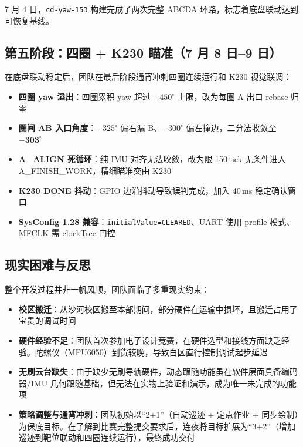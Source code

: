 \documentclass[12pt,a4paper]{ctexart}
\begin{document}
7 月 4 日，\texttt{cd-yaw-153} 构建完成了两次完整 ABCDA 环路，标志着底盘联动达到可恢复基线。

\subsection{第五阶段：四圈 + K230 瞄准（7 月 8 日--9 日）}

在底盘联动稳定后，团队在最后阶段通宵冲刺四圈连续运行和 K230 视觉联调：

\begin{itemize}
    \item \textbf{四圈 yaw 溢出}：四圈累积 yaw 超过 $\pm450^\circ$ 上限，改为每圈 A 出口 rebase 归零
    \item \textbf{圈间 AB 入口角度}：$-325^\circ$ 偏右漏 B、$-300^\circ$ 偏左撞边，二分法收敛至 $\mathbf{-303^\circ}$
    \item \textbf{A\_ALIGN 死循环}：纯 IMU 对齐无法收敛，改为限 150\,tick 无条件进入 A\_FINISH\_WORK，精细瞄准交由 K230
    \item \textbf{K230 DONE 抖动}：GPIO 边沿抖动导致误判完成，加入 40\,ms 稳定确认窗口
    \item \textbf{SysConfig 1.28 兼容}：\texttt{initialValue=CLEARED}、UART 使用 profile 模式、MFCLK 需 clockTree 门控
\end{itemize}

\subsection{现实困难与反思}

整个开发过程并非一帆风顺，团队面临了多重现实约束：

\begin{itemize}
    \item \textbf{校区搬迁}：从沙河校区搬至本部期间，部分硬件在运输中损坏，且搬迁占用了宝贵的调试时间
    \item \textbf{硬件经验不足}：团队首次参加电子设计竞赛，在硬件选型和接线方面缺乏经验。陀螺仪（MPU6050）到货较晚，导致白区直行控制调试起步延迟
    \item \textbf{无刷云台缺失}：由于缺少无刷导轨硬件，动态跟随功能虽在软件层面具备编码器/IMU 几何跟随基础，但无法在实物上验证和演示，成为唯一未完成的功能项
    \item \textbf{策略调整与通宵冲刺}：团队初始以“2+1”（自动巡迹 + 定点作业 + 同步绘制）为保底目标。在了解到比赛完整提交要求后，连夜将目标扩展为“3+2”（增加巡迹到靶位联动和四圈连续运行），最终成功交付
\end{itemize}
\end{document}
